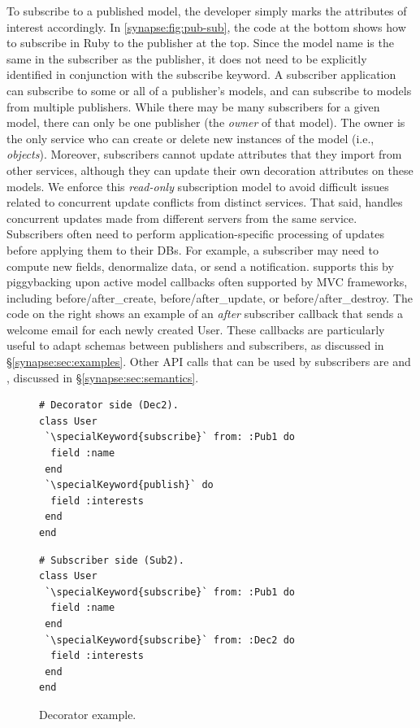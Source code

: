 To subscribe to a published model, the developer simply marks the attributes of
interest accordingly.  In \F\ref{synapse:fig:pub-sub}, the code at the bottom
shows how to subscribe in Ruby to the publisher at the top.  Since
the model name is the same in the subscriber as the publisher, it does not
need to be explicitly identified in conjunction with the 
{\code subscribe} keyword. 
A subscriber application can subscribe to some or all of a publisher's
models, and can subscribe to models from multiple publishers. While
there may be many subscribers for a given model, there can only be one
publisher (the {\em owner} of that model). The owner is the only
service who can create or delete new instances of the model (i.e.,
{\em objects}). Moreover, subscribers cannot update attributes that they
import from other services, although they can update their own
decoration attributes on these models. We enforce this {\em read-only}
subscription model to avoid difficult issues related to concurrent update
conflicts from distinct services.
That said, \synapse handles concurrent updates made from different
servers from the same service.
Subscribers often need to perform
application-specific processing of updates before applying them to their
DBs. For example, a subscriber may need to compute new fields,
denormalize data, or send a notification.  \synapse supports this by
piggybacking upon active model callbacks often supported by MVC frameworks,
including {\code \small before/after\_create}, {\code \small before/after\_update}, or
{\code \small  before/after\_destroy}.
The code on the right shows an example of an \emph{after} subscriber callback that
sends a welcome email for each newly created User.
These callbacks are particularly useful to adapt schemas
between publishers and subscribers, as discussed in
\S\ref{synapse:sec:examples}. 
Other API calls that can be used by subscribers are {}
and {}, discussed in \S\ref{synapse:sec:semantics}.

\begin{figure}
\centering
\begin{minipage}{.8\textwidth}
\begin{minipage}{.4\textwidth}
\begin{lstlisting}[framexleftmargin=5pt]
# Decorator side (Dec2).
class User
 `\specialKeyword{subscribe}` from: :Pub1 do
  field :name
 end
 `\specialKeyword{publish}` do
  field :interests
 end
end
\end{lstlisting}
\end{minipage}
\hspace{1.2in}
\begin{minipage}{.4\textwidth}
\begin{lstlisting}[framexleftmargin=5pt]
# Subscriber side (Sub2).
class User
 `\specialKeyword{subscribe}` from: :Pub1 do
  field :name
 end
 `\specialKeyword{subscribe}` from: :Dec2 do
  field :interests
 end
end
\end{lstlisting}
\end{minipage}
\end{minipage}
\caption{Decorator example.}
\label{synapse:fig:deco}
\end{figure}

